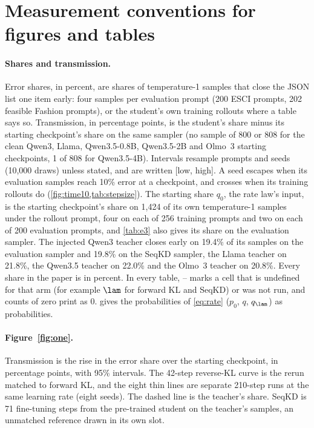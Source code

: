 \section{Measurement conventions for figures and tables}
\label{app:conventions}

\paragraph{Shares and transmission.}
Error shares, in percent, are shares of temperature-1 samples that close the JSON list one item early: four samples per evaluation prompt (200 ESCI prompts, 202 feasible Fashion prompts), or the student's own training rollouts where a table says so.
Transmission, in percentage points, is the student's share minus its starting checkpoint's share on the same sampler (no sample of 800 or 808 for the clean Qwen3, Llama, Qwen3.5-0.8B, Qwen3.5-2B and Olmo~3 starting checkpoints, 1 of 808 for Qwen3.5-4B).
Intervals resample prompts and seeds (10,000 draws) unless stated, and are written [low, high].
A seed escapes when its evaluation samples reach 10\% error at a checkpoint, and crosses when its training rollouts do (\cref{fig:time10,tab:stepsize}).
The starting share $q_0$, the rate law's input, is the starting checkpoint's share on 1,424 of its own temperature-1 samples under the rollout prompt, four on each of 256 training prompts and two on each of 200 evaluation prompts, and \cref{tab:e3} also gives its share on the evaluation sampler.
The injected Qwen3 teacher closes early on 19.4\% of its samples on the evaluation sampler and 19.8\% on the SeqKD sampler, the Llama teacher on 21.8\%, the Qwen3.5 teacher on 22.0\% and the Olmo~3 teacher on 20.8\%.
Every share in the paper is in percent.
In every table, -- marks a cell that is undefined for that arm (for example $\lam$ for forward KL and SeqKD) or was not run, and counts of zero print as 0.
 gives the probabilities of \cref{eq:rate} ($p_0$, $q$, $q_\lam$) as probabilities.

\paragraph{Figure~\ref{fig:one}.}
Transmission is the rise in the error share over the starting checkpoint, in percentage points, with 95\% intervals.
The 42-step reverse-KL curve is the rerun matched to forward KL, and the eight thin lines are separate 210-step runs at the same learning rate (eight seeds).
The dashed line is the teacher's share.
SeqKD is 71 fine-tuning steps from the pre-trained student on the teacher's samples, an unmatched reference drawn in its own slot.

